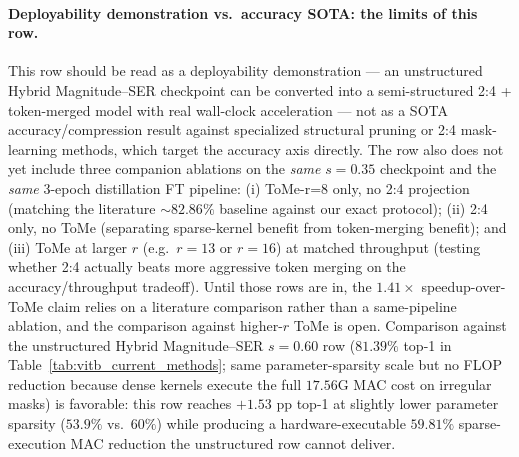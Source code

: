 \documentclass[11pt]{article}
\theoremstyle{plain}
\theoremstyle{definition}
\theoremstyle{remark}
\newcommand{\1}{\mathbf{1}}
\begin{document}
\paragraph{Deployability demonstration vs.\ accuracy SOTA: the limits of this row.}
This row should be read as a deployability demonstration --- an unstructured Hybrid Magnitude--SER checkpoint can be converted into a semi-structured 2:4 + token-merged model with real wall-clock acceleration --- not as a SOTA accuracy/compression result against specialized structural pruning or 2:4 mask-learning methods, which target the accuracy axis directly.  The row also does not yet include three companion ablations on the \emph{same} \(s=0.35\) checkpoint and the \emph{same} 3-epoch distillation FT pipeline: (i) ToMe-r=8 only, no 2:4 projection (matching the literature \(\sim\!82.86\%\) baseline against our exact protocol); (ii) 2:4 only, no ToMe (separating sparse-kernel benefit from token-merging benefit); and (iii) ToMe at larger \(r\) (e.g.\ \(r=13\) or \(r=16\)) at matched throughput (testing whether 2:4 actually beats more aggressive token merging on the accuracy/throughput tradeoff).  Until those rows are in, the \(1.41\!\times\) speedup-over-ToMe claim relies on a literature comparison rather than a same-pipeline ablation, and the comparison against higher-\(r\) ToMe is open.  Comparison against the unstructured Hybrid Magnitude--SER \(s=0.60\) row (\(81.39\%\) top-1 in Table~\ref{tab:vitb_current_methods}; same parameter-sparsity scale but no FLOP reduction because dense kernels execute the full \(17.56\)G MAC cost on irregular masks) is favorable: this row reaches \(+1.53\) pp top-1 at slightly lower parameter sparsity (\(53.9\%\) vs.\ \(60\%\)) while producing a hardware-executable \(59.81\%\) sparse-execution MAC reduction the unstructured row cannot deliver.
\end{document}
